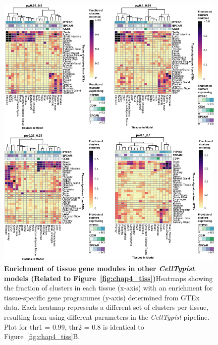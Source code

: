 \begin{figure}[ht!] 
\centering
\includegraphics[scale=0.77]{Appendix2/Figs/appB_tissueGSEA.png} %
\caption[Enrichment of tissue gene modules in other \textit{CellTypist} models]{\textbf{Enrichment of tissue gene modules in other \textit{CellTypist} models (Related to Figure~\ref{fig:chap4_tiss})}\newline Heatmaps showing the fraction of clusters in each tissue (x-axis) with an enrichment for tissue-specific gene programmes (y-axis) determined from GTEx data. Each heatmap represents a different set of clusters per tissue, resulting from using different parameters in the \textit{CellTypist} pipeline. Plot for thr1 = 0.99, thr2 = 0.8 is identical to Figure~\ref{fig:chap4_tiss}B.}
\label{fig:appB_tissGSEA}
\end{figure}


